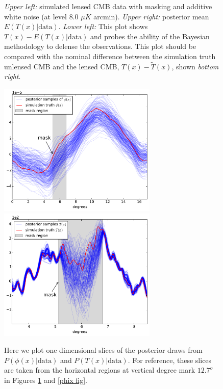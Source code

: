 \documentclass[iop,revtex4,apj,onecolumn]{emulateapj}
\begin{document}
\begin{figure}
\begin{center}
\end{center}
\caption{\label{tilde fig}
{\em Upper left:} simulated lensed CMB data with masking and additive white noise (at level $8.0$ $\mu K$ arcmin). {\em Upper right:} posterior mean $E(T(x)|\text{data})$. {\em Lower left:} This plot shows $T(x) - E(T(x)|\text{data})$ and probes the ability of the Bayesian methodology to delense the observations. This plot should be compared with the nominal difference between the simulation truth unlensed CMB and the lensed CMB,  $T(x) - \widetilde T(x)$, shown {\em bottom right}.
 }
\end{figure}



\begin{figure}
\begin{center}
{\includegraphics[height=2.5in]{figure7a.pdf}}%
{\includegraphics[height=2.5in]{figure7b.pdf}}
\end{center}
\caption{\label{slice fig} Here we plot one dimensional slices of the posterior draws from $P(\phi(x)|\text{data})$ and $P(T(x)|\text{data})$. For reference, these slices are taken from the horizontal regions at vertical degree mark $12.7^o$ in Figures \ref{tilde fig} and \ref{phix fig}.
}
\end{figure}
\end{document}
